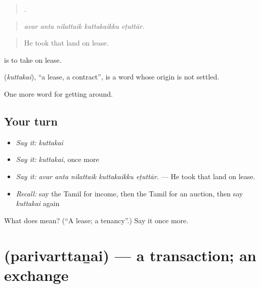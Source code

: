 \begin{quote}
    .
\end{quote}

\begin{quote}
\emph{avar anta nilattaik kuttakaikku eṭuttār.}
\end{quote}

\begin{quote}
He took that land on lease.
\end{quote}

  is to take on lease.

\begin{cousinweb}
\textbf{} (\emph{kuttakai}), \textquotedblleft{}a lease, a contract\textquotedblright{}, is a word whose origin is not settled.
\end{cousinweb}

\begin{grammarlens}[title={What you've built}]
One more word for getting around.
\end{grammarlens}

\subsection*{Your turn}
\begin{itemize}
\raggedright
  \item \emph{Say it:} \emph{kuttakai}
  \item \emph{Say it:} \emph{kuttakai}, once more
  \item \emph{Say it:} \emph{avar anta nilattaik kuttakaikku eṭuttār.} — He took that land on lease.
  \item \emph{Recall:} say the Tamil for income, then the Tamil for an auction, then say \emph{kuttakai} again
\end{itemize}

\begin{tcolorbox}[breakable,colback=teal!4,colframe=teal!35!black,title={Before you move on}]
What does  mean? (\textquotedblleft{}A lease; a tenancy\textquotedblright{}.) Say it once more.
\end{tcolorbox}
\section[\texorpdfstring{\ta{பரிவர்த்தனை} (parivarttaṉai)}{பரிவர்த்தனை (parivarttaṉai)}]{ (parivarttaṉai) — a transaction; an exchange}

